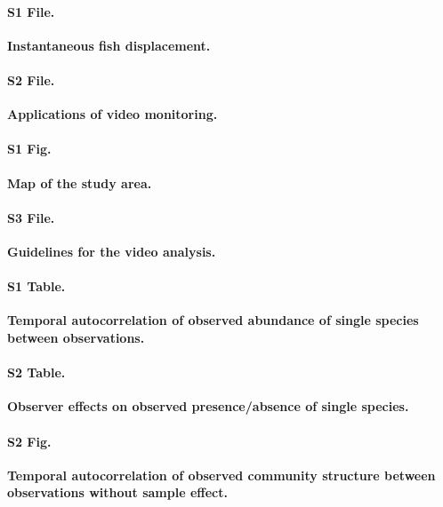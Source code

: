 \documentclass[10pt,letterpaper]{article}
\begin{document}
\paragraph*{S1 File.}
\label{ap:add:instant}
{\bf Instantaneous fish displacement.}

\paragraph*{S2 File.}
\label{ap:add:applic}
{\bf Applications of video monitoring.}

\paragraph*{S1 Fig.}
\label{fig:MAP}
{\bf Map of the study area.}

\paragraph*{S3 File.}
\label{Video_analysis}
{\bf Guidelines for the video analysis.}

\label{Independence}
\paragraph*{S1 Table.}
\label{ACF}
{\bf Temporal autocorrelation of observed abundance of single species between observations.}

\paragraph*{S2 Table.}
\label{BIN_MODEL_SIGN}
{\bf Observer effects on observed presence/absence of single species.}

\paragraph*{S2 Fig.}
\label{fig:plotpmgram1}
{\bf Temporal autocorrelation of observed community structure between observations without sample effect.}
\end{document}
